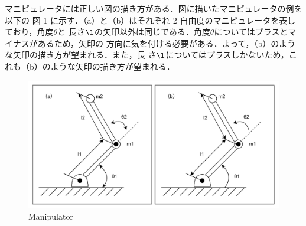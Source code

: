 
マニピュレータには正しい図の描き方がある．図に描いたマニピュレータの例を以下の
図 1 に示す．（a）と（b）はそれぞれ 2 自由度のマニピュレータを表しており，角度$\theta$と
長さ$\l$の矢印以外は同じである．角度$\theta$についてはプラスとマイナスがあるため，矢印の
方向に気を付ける必要がある．よって，（b）のような矢印の描き方が望まれる．また，長
さ$\l$についてはプラスしかないため，これも（b）のような矢印の描き方が望まれる．
\begin{figure}[hbtp]
  \centering
 \includegraphics[keepaspectratio, scale=0.8]
      {images/mani.png}
 \caption{Manipulator}
 \label{Fig:manipulator}
\end{figure}

\newpage
